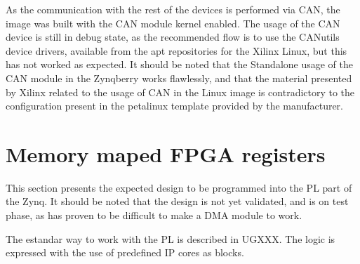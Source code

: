 As the communication with the rest of the devices is performed via CAN, the image was built with the
CAN module kernel enabled. The usage of the CAN device is still in debug state, as the recommended
flow is to use the CANutils device drivers, available from the apt repositories for the Xilinx
Linux, but this has not worked as expected. It should be noted that the Standalone usage of the CAN
module in the Zynqberry works flawlessly, and that the material presented by Xilinx related to
the usage of CAN in the Linux image is contradictory to the configuration present in the petalinux
template provided by the manufacturer.

\section{Memory maped FPGA registers}

This section presents the expected design to be programmed into the PL part of the Zynq. It should be noted that the design is not yet validated, and is on test phase, as has proven to be difficult to make a DMA module to work.

The estandar way to work with the PL is described in UGXXX. The logic is expressed with the use of predefined IP cores as blocks.

